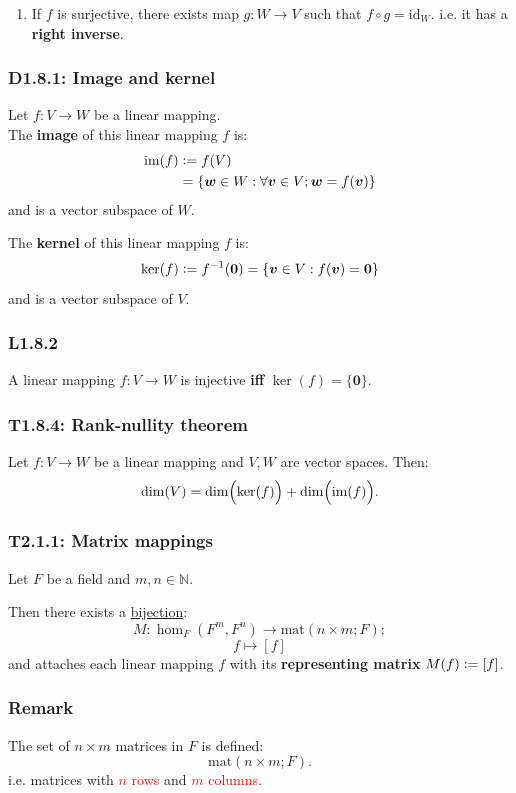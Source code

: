 \documentclass{article}
\newcommand{\deq}{\vcentcolon=}
\newcommand{\vc}[1]{\boldsymbol{#1}}
\begin{document}
\begin{multicols*}{3}
\begin{enumerate}
    \item If $f$ is surjective, there exists map
    $g:W\rightarrow V$ such that $f\circ g=\text{id}_W$.
    i.e. it has a \textbf{right inverse}.
\end{enumerate}

\subsubsection*{D1.8.1: Image and kernel}
Let $f:V\rightarrow W$ be a linear mapping. \\
The \textbf{image} of this linear mapping $f$ is:
\begin{align*}
    \text{im}(f)&\deq f(V) \\
    &=\{\vc{w}\in W:
    \forall\vc{v}\in V;\vc{w}=f(\vc{v})\}
\end{align*}
and is a vector subspace of $W$.

The \textbf{kernel} of this linear mapping $f$ is:
$$\ker(f)\deq f^{-1}(\vc{0})
=\{\vc{v}\in V:f(\vc{v})=\vc{0}\}$$
and is a vector subspace of $V$.

\subsubsection*{L1.8.2}
A linear mapping $f:V\rightarrow W$ is injective
\textbf{if{}f} $\ker(f)=\{\vc{0}\}$.

\subsubsection*{T1.8.4: Rank-nullity theorem}
Let $f:V\rightarrow W$ be a linear mapping and
$V,W$ are vector spaces. Then:
$$\dim(V)=\dim\Bigl(\ker(f)\Bigr)
+\dim\Bigl(\text{im}(f)\Bigr).$$

\subsubsection*{T2.1.1: Matrix mappings}
Let $F$ be a field and $m,n\in\mathbb{N}$.

Then there exists a \underline{bijection}:
$$M:\hom_F(F^m,F^n)\rightarrow\text{mat}(n\times m;F);$$
$$f\mapsto[f]$$
and attaches each linear mapping $f$ with its
\textbf{representing matrix} $M(f)\deq[f]$.

\subsubsection*{Remark}
The set of $n\times m$ matrices in $F$ is defined:
$$\text{mat}(n\times m;F).$$
i.e. 
matrices with \textcolor{red}{$n$ rows}
and \textcolor{red}{$m$ columns}.



\end{multicols*}
\end{document}
